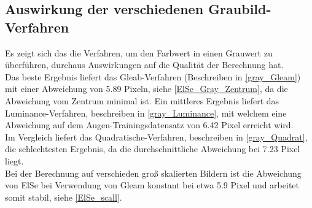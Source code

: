 \subsection{Auswirkung der verschiedenen Graubild-Verfahren}
Es zeigt sich das die Verfahren, um den Farbwert in einen Grauwert zu überführen, durchaus Auswirkungen auf die Qualität der Berechnung hat.\\
Das beste Ergebnis liefert das Gleab-Verfahren (Beschreiben in \autoref{gray_Gleam}) mit einer Abweichung von 5.89 Pixeln, siehe \autoref{ElSe_Gray_Zentrum}, da die Abweichung vom Zentrum minimal ist. Ein mittleres Ergebnis liefert das Luminance-Verfahren, beschreiben in \autoref{gray_Luminance}, mit welchem eine Abweichung auf dem Augen-Trainingsdatensatz von 6.42 Pixel erreicht wird.\\
Im Vergleich liefert das Quadratische-Verfahren, beschreiben in \autoref{gray_Quadrat}, die schlechtesten Ergebnis, da die durchschnittliche Abweichung bei 7.23 Pixel liegt.\\
Bei der Berechnung auf verschieden groß skalierten Bildern ist die Abweichung von ElSe bei Verwendung von Gleam konstant bei etwa 5.9 Pixel und arbeitet somit stabil, siehe \autoref{ElSe_scall}.
